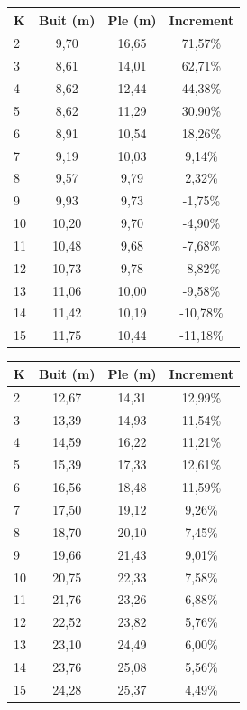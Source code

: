 \begin{table}[h]
   \begin{center}
      \begin{tabular}{|l|c|c|c|}
        \hline
        \cellcolor[gray]{0.9} K & \cellcolor[gray]{0.9} Buit (m) & \cellcolor[gray]{0.9} Ple (m) & \cellcolor[gray]{0.9} Increment \\ \hline

        2  & 9,70  & 16,65 & 71,57\%  \\
        3  & 8,61  & 14,01 & 62,71\%  \\
        4  & 8,62  & 12,44 & 44,38\%  \\
        5  & 8,62  & 11,29 & 30,90\%  \\
        6  & 8,91  & 10,54 & 18,26\%  \\
        7  & 9,19  & 10,03 & 9,14\%   \\
        8  & 9,57  & 9,79  & 2,32\%   \\     
        9  & 9,93  & 9,73  & -1,75\%  \\
        10 & 10,20 & 9,70  & -4,90\%  \\
        11 & 10,48 & 9,68  & -7,68\%  \\
        12 & 10,73 & 9,78  & -8,82\%  \\
        13 & 11,06 & 10,00 & -9,58\%  \\
        14 & 11,42 & 10,19 & -10,78\% \\
        15 & 11,75 & 10,44 & -11,18\% \\  \hline


      \end{tabular}
      
      \hspace{10pt}
      
      \begin{tabular}{|l|c|c|c|}
        \hline
        \cellcolor[gray]{0.9} K & \cellcolor[gray]{0.9} Buit (m) & \cellcolor[gray]{0.9} Ple (m) & \cellcolor[gray]{0.9} Increment \\ \hline

        2  & 12,67 & 14,31 & 12,99\% \\
        3  & 13,39 & 14,93 & 11,54\% \\
        4  & 14,59 & 16,22 & 11,21\% \\
        5  & 15,39 & 17,33 & 12,61\% \\
        6  & 16,56 & 18,48 & 11,59\% \\
        7  & 17,50 & 19,12 & 9,26\% \\
        8  & 18,70 & 20,10 & 7,45\% \\
        9  & 19,66 & 21,43 & 9,01\% \\
        10 & 20,75 & 22,33 & 7,58\% \\
        11 & 21,76 & 23,26 & 6,88\% \\
        12 & 22,52 & 23,82 & 5,76\% \\
        13 & 23,10 & 24,49 & 6,00\% \\
        14 & 23,76 & 25,08 & 5,56\% \\
        15 & 24,28 & 25,37 & 4,49\% \\  \hline


\end{tabular}
\end{center}
\end{table}
